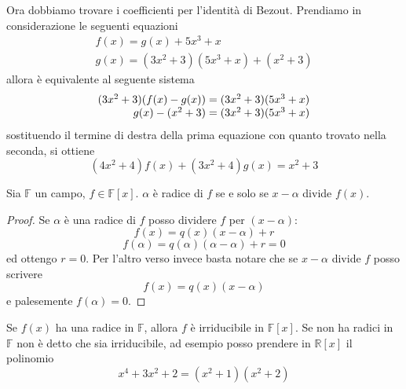 \begin{esercizio}
	Ora dobbiamo trovare i coefficienti per l'identità di Bezout. Prendiamo in considerazione 
	le seguenti equazioni 
	\begin{equation*}
		\begin{array}{l}
			f(x)= g(x) + 5x^3+x  \\
			g(x)= (3x^2+3)(5x^3+x) + (x^2+3) 
		\end{array}
	\end{equation*}
	allora è equivalente al seguente sistema
	\begin{equation*}
		\arraycolsep=1.4pt
		\begin{array}{rl}
			(3x^2+3)(f(x)-g(x)) &= (3x^2+3)(5x^3+x)  \\
			g(x) - (x^2+3) &= (3x^2+3)(5x^3+x)  
		\end{array}
	\end{equation*}
	sostituendo il termine di destra della prima equazione con quanto trovato nella seconda, 
	si ottiene 
	\begin{equation*}
		(4x^2+4)f(x) + (3x^2+4)g(x) = x^2 + 3
	\end{equation*}
\end{esercizio}
\begin{teorema}[di Ruffini]
	Sia $\mathbb{F}$ un campo, $f\in\mathbb{F}[x]$. $\alpha$ è radice di $f$ se e solo se $x-\alpha$ divide $f(x)$.
\end{teorema}
\begin{proof}
	Se $\alpha$ è una radice di $f$ posso dividere $f$ per $(x-\alpha)$:
	\begin{equation*}
	f(x)=q(x)(x-\alpha)+r
	\end{equation*}
	\begin{equation*}
	f(\alpha)=q(\alpha)(\alpha-\alpha)+r=0
	\end{equation*}
	ed ottengo $r=0$. Per l'altro verso invece basta notare che se $x-\alpha$ divide $f$ posso scrivere
	\begin{equation*}
	f(x)=q(x)(x-\alpha)
	\end{equation*}
	e palesemente $f(\alpha)=0$.
\end{proof}
\begin{osservazione}
	Se $f(x)$ ha una radice in $\mathbb{F}$, allora $f$ è irriducibile in $\mathbb{F}[x]$. Se non ha radici in $\mathbb{F}$ non è detto che sia irriducibile, ad esempio posso prendere in $\mathbb{R}[x]$ il polinomio
	\begin{equation*}
	x^4+3x^2+2=(x^2+1)(x^2+2)
	\end{equation*}
\end{osservazione}





